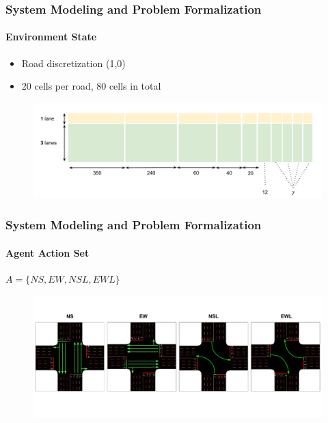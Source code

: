 \documentclass[aspectratio=169]{beamer}
\begin{document}
\begin{frame}
\frametitle{System Modeling and Problem Formalization}
\framesubtitle{Environment State}
\vspace{1cm}

\begin{minipage}{0.3\textwidth}
\begin{itemize}
    \item Road discretization (1,0)
    \item 20 cells per road, 80 cells in total
\end{itemize}
\end{minipage}%
\hfill
\begin{minipage}{0.7\textwidth}
\begin{figure}
    \centering
    \includegraphics[width=1\linewidth]{images/State cells length.pdf}
\end{figure}
\end{minipage}
\end{frame}
\begin{frame}
\frametitle{System Modeling and Problem Formalization}
\framesubtitle{Agent Action Set}
\vspace{1cm}
\begin{minipage}{0.1\textwidth}
    $A = \{NS, EW, NSL, EWL\}$
\end{minipage}%
\vfill
\begin{minipage}{1\textwidth}
\begin{figure}
    \centering
    \includegraphics[width=1\linewidth]{images/Possible actions.pdf}
\end{figure}
\end{minipage}
\end{frame}
\end{document}
